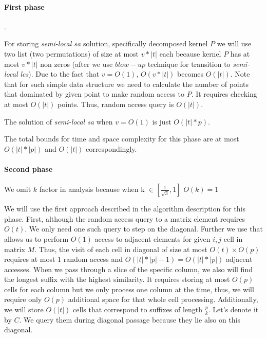 \paragraph{First phase}.

For storing \emph{semi-local sa} solution, specifically decomposed kernel $P$ we will use two list (two permutations) of size at most $v*|t|$ each because kernel $P$ has at most $v*|t|$ non zeros (after we use $blow-up$ technique for transition  to \emph{semi-local lcs}).
Due to the fact that $v = O(1)$, $O(v*|t|)$ becomes $O(|t|)$.
Note that for such simple data structure we need to calculate the number of points that dominated by given point to make random access to $P$. It requires checking at most   $O(|t|)$ points. 
Thus, random access query is $O(|t|)$.

The solution of \emph{semi-local sa} when $v=O(1)$ is just $O(|t|*p)$.

The total bounds for time and space complexity for this phase are at most $O(|t|*|p|)$ and $O(|t|)$ correspondingly.

\paragraph{Second phase}
We omit $k$ factor in analysis because when k $\in [\frac{1}{\sqrt{3}},1]$ $O(k) = 1$

We will use the first approach described in the algorithm description for this phase.
First, although the random access query to a matrix element requires $O(t)$.
We only need one such query to step on the diagonal.
Further we use  that allows us to perform $O(1)$ access to adjacent elements for given $i,j$ cell in matrix $M$.
Thus, the visit of each cell in diagonal of size at most $O(t) \times O(p) $ requires at most $1$ random access and $O(|t|*|p| -1) =O(|t|*|p|)$ adjacent accesses.
When we pass through a slice of the specific column, we also will find the longest suffix with the highest similarity.
It requires storing at most $O(p)$ cells for each column but we only process one column at the time, thus, we will require only $O(p)$ additional space for that whole cell processing.
Additionally, we will store $O(|t|)$ cells that correspond to suffixes of length $\frac{p}{k}$.
Let's denote it by $C$. 
We query them during diagonal passage because they lie also on this diagonal.
  
